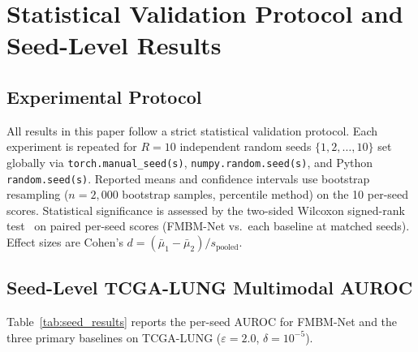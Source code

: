 \documentclass{ieeeaccess}
\begin{document}




\section{Statistical Validation Protocol and Seed-Level Results}
\label{app:stats}

\subsection{Experimental Protocol}
All results in this paper follow a strict statistical validation protocol.
Each experiment is repeated for $R\!=\!10$ independent random seeds
$\{1, 2, \ldots, 10\}$ set globally via \texttt{torch.manual\_seed(s)},
\texttt{numpy.random.seed(s)}, and Python \texttt{random.seed(s)}.
Reported means and confidence intervals use bootstrap resampling
($n\!=\!2{,}000$ bootstrap samples, percentile method) on the 10 per-seed
scores. Statistical significance is assessed by the two-sided Wilcoxon
signed-rank test~\cite{wilcoxon1945} on paired per-seed scores
(FMBM-Net vs.\ each baseline at matched seeds). Effect sizes are
Cohen's $d\!=\!(\bar\mu_1 - \bar\mu_2)/s_{\mathrm{pooled}}$.

\subsection{Seed-Level TCGA-LUNG Multimodal AUROC}
Table~\ref{tab:seed_results} reports the per-seed AUROC for FMBM-Net and
the three primary baselines on TCGA-LUNG
($\varepsilon\!=\!2.0$, $\delta\!=\!10^{-5}$).
\end{document}
